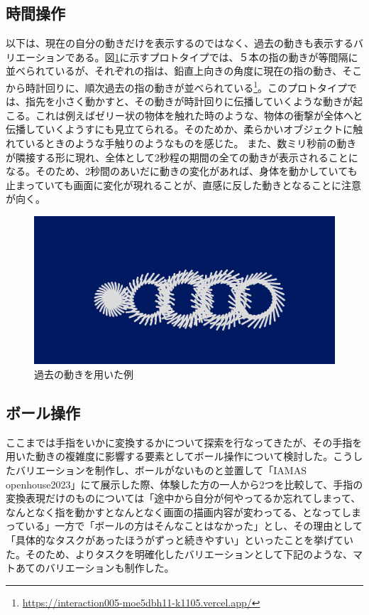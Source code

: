 \subsection{時間操作}
以下は、現在の自分の動きだけを表示するのではなく、過去の動きも表示するバリエーションである。図\ref{fig:prototype_delay}に示すプロトタイプでは、５本の指の動きが等間隔に並べられているが、それぞれの指は、鉛直上向きの角度に現在の指の動き、そこから時計回りに、順次過去の指の動きが並べられている\footnote{\url{https://interaction005-moe5dbh11-k1105.vercel.app/}}。このプロトタイプでは、指先を小さく動かすと、その動きが時計回りに伝播していくような動きが起こる。これは例えばゼリー状の物体を触れた時のような、物体の衝撃が全体へと伝播していくようすにも見立てられる。そのためか、柔らかいオブジェクトに触れているときのような手触りのようなものを感じた。
また、数ミリ秒前の動きが隣接する形に現れ、全体として2秒程の期間の全ての動きが表示されることになる。そのため、2秒間のあいだに動きの変化があれば、身体を動かしていても止まっていても画面に変化が現れることが、直感に反した動きとなることに注意が向く。

\begin{figure}[H]
  \centering
  \includegraphics[width=15cm]{img/past_time.png}
  \caption{過去の動きを用いた例}
  \label{fig:prototype_delay}
\end{figure}

\subsection{ボール操作}
ここまでは手指をいかに変換するかについて探索を行なってきたが、その手指を用いた動きの複雑度に影響する要素としてボール操作について検討した。こうしたバリエーションを制作し、ボールがないものと並置して「IAMAS openhouse2023」にて展示した際、体験した方の一人から2つを比較して、手指の変換表現だけのものについては「途中から自分が何やってるか忘れてしまって、なんとなく指を動かすとなんとなく画面の描画内容が変わってる、となってしまっている」一方で「ボールの方はそんなことはなかった」とし、その理由として「具体的なタスクがあったほうがずっと続きやすい」といったことを挙げていた。そのため、よりタスクを明確化したバリエーションとして下記のような、マトあてのバリエーションも制作した。

